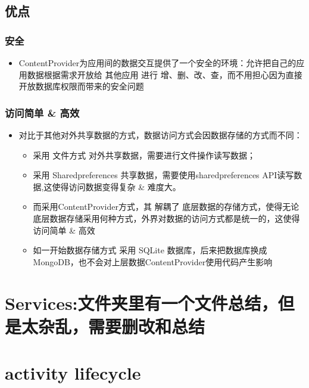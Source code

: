 \documentclass[9pt, b5paaper]{book}
\begin{document}
\section{优点}
\label{sec-5-8}
\subsection{安全}
\label{sec-5-8-1}
\begin{itemize}
\item ContentProvider为应用间的数据交互提供了一个安全的环境：允许把自己的应用数据根据需求开放给 其他应用 进行 增、删、改、查，而不用担心因为直接开放数据库权限而带来的安全问题
\end{itemize}
\subsection{访问简单 \& 高效}
\label{sec-5-8-2}
\begin{itemize}
\item 对比于其他对外共享数据的方式，数据访问方式会因数据存储的方式而不同：
\begin{itemize}
\item 采用 文件方式 对外共享数据，需要进行文件操作读写数据；
\item 采用 Sharedpreferences 共享数据，需要使用sharedpreferences API读写数据,这使得访问数据变得复杂 \& 难度大。
\item 而采用ContentProvider方式，其 解耦了 底层数据的存储方式，使得无论底层数据存储采用何种方式，外界对数据的访问方式都是统一的，这使得访问简单 \& 高效
\item 如一开始数据存储方式 采用 SQLite 数据库，后来把数据库换成 MongoDB，也不会对上层数据ContentProvider使用代码产生影响
\end{itemize}
\end{itemize}

\chapter{Services:文件夹里有一个文件总结，但是太杂乱，需要删改和总结}
\label{sec-6}
\chapter{}
\label{sec-7}
\chapter{activity lifecycle}
\label{sec-8}
\end{document}
